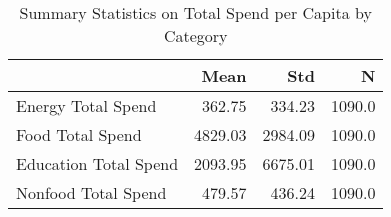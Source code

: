 \begin{table}[h]
\caption{Summary Statistics on Total Spend per Capita by Category}
\centering
\begin{tabular}{lrrr}
\toprule
{} &     Mean &      Std &       N \\
\midrule
Energy Total Spend    &   362.75 &   334.23 &  1090.0 \\
Food Total Spend      &  4829.03 &  2984.09 &  1090.0 \\
Education Total Spend &  2093.95 &  6675.01 &  1090.0 \\
Nonfood Total Spend   &   479.57 &   436.24 &  1090.0 \\
\bottomrule
\end{tabular}
\label{table:4}
\end{table}